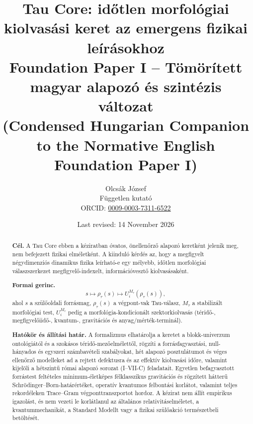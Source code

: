 \documentclass[12pt]{article}
\title{\textbf{Tau Core: időtlen morfológiai kiolvasási keret az emergens fizikai leírásokhoz}\\
\large Foundation Paper I -- Tömörített magyar alapozó és szintézis változat\\
\small (Condensed Hungarian Companion to the Normative English Foundation Paper I)}
\author{Olcsák József\\
\small Független kutató\\{\small ORCID: \href{https://orcid.org/0009-0003-7311-6522}{0009-0003-7311-6522}}}
\date{Last revised: 14 November 2026}
\newcommand{\Rmap}{\rho_{\tau}}
\newcommand{\Mta}{M_{\tau}}
\begin{document}
\maketitle

\begin{abstract}
\noindent\textbf{Cél.}
A Tau Core ebben a kéziratban óvatos, önellenőrző alapozó keretként jelenik meg, nem befejezett fizikai elméletként. A kiinduló kérdés az, hogy a megfigyelt négydimenziós dinamikus fizika leírható-e egy mélyebb, időtlen morfológiai válaszszerkezet megfigyelő-indexelt, információvesztő kiolvasásaként.

\medskip
\noindent\textbf{Formai gerinc.}
\[
  s \longmapsto \Rmap(s) \longmapsto U_i^{\Mta}(\Rmap(s)),
\]
ahol \(s\) a szülőoldali forrásmag, \(\Rmap(s)\) a végpont-vak Tau-válasz, \(\Mta\) a stabilizált morfológiai test, \(U_i^{\Mta}\) pedig a morfológia-kondicionált szektorkiolvasás (téridő-, megfigyelőiidő-, kvantum-, gravitációs és anyag/mérték-terminál).

\medskip
\noindent\textbf{Hatókör és állítási határ.}
A formalizmus elhatárolja a keretet a blokk-univerzum ontológiától és a szokásos téridő-mezőelmélettől, rögzíti a forrásfagyasztási, null-hányados és egyszeri számbavételi szabályokat, hét alapozó posztulátumot és véges ellenőrző modelleket ad a rejtett defektusra és az effektív kiolvasási időre, valamint kijelöli a hétszintű római alapozó sorozat (I--VII-C) feladatait. Egyetlen befagyasztott forrástest feltételes minimum-életképes félklasszikus gravitációs és rögzített hátterű Schrödinger--Born-határértéket, operatív kvantumos felbontási korlátot, valamint teljes rekordéleken Trace--Gram végponttranszportot hordoz. A kézirat nem állít empirikus igazolást, és nem vezeti le korlátlanul az általános relativitáselméletet, a kvantummechanikát, a Standard Modellt vagy a fizikai szülőakció természetbeli betöltését.
\end{abstract}

\medskip
\noindent{}
\end{document}
